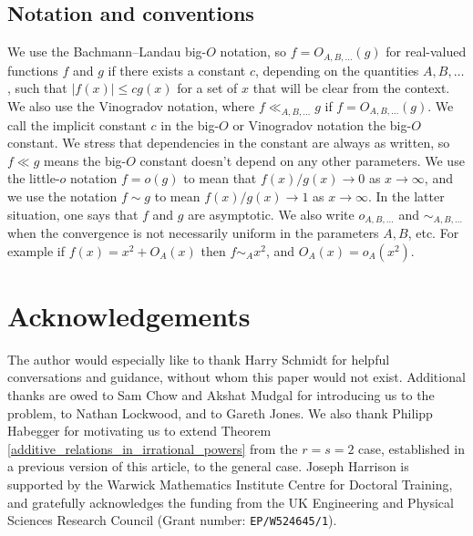\documentclass[9pt]{amsart}
\theoremstyle{my_theorem_style}
\numberwithin{definition}{section}
\begin{document}
\subsection{Notation and conventions}
\label{notations_and_conventions}

We use the Bachmann--Landau big-$O$ notation, so $f = O_{A, B, \dots}(g)$ for real-valued functions $f$ and $g$ if there exists a constant $c$, depending on the quantities $A, B, \dots$, such that $|f(x)| \leq c g(x)$ for a set of $x$ that will be clear from the context. We also use the Vinogradov notation, where $f \ll_{A, B, \dots} g$ if $f = O_{A, B, \dots}(g)$. We call the implicit constant $c$ in the big-$O$ or Vinogradov notation the big-$O$ constant. We stress that dependencies in the constant are always as written, so $f \ll g$ means the big-$O$ constant doesn't depend on any other parameters. We use the little-$o$ notation $f = o(g)$ to mean that $f(x)/g(x) \to 0$ as $x \to \infty$, and we use the notation $f \sim g$ to mean $f(x)/g(x) \to 1$ as $x \to \infty$. In the latter situation, one says that $f$ and $g$ are asymptotic. We also write $o_{A, B, \dots}$ and $\sim_{A, B, \dots}$ when the convergence is not necessarily uniform in the parameters $A, B$, etc. For example if $f(x) = x^2 + O_A(x)$ then $f \sim_A x^2$, and $O_A(x) = o_A(x^2)$.


\section*{Acknowledgements}

The author would especially like to thank Harry Schmidt for helpful conversations and guidance, without whom this paper would not exist. Additional thanks are owed to Sam Chow and Akshat Mudgal for introducing us to the problem, to Nathan Lockwood, and to Gareth Jones. We also thank Philipp Habegger for motivating us to extend Theorem \ref{additive_relations_in_irrational_powers} from the $r = s = 2$ case, established in a previous version of this article, to the general case. Joseph Harrison is supported by the Warwick Mathematics Institute Centre for Doctoral Training, and gratefully acknowledges the funding from the UK Engineering and Physical Sciences Research Council (Grant number: \texttt{EP/W524645/1}).

% 
% 
% 
% 
\end{document}
